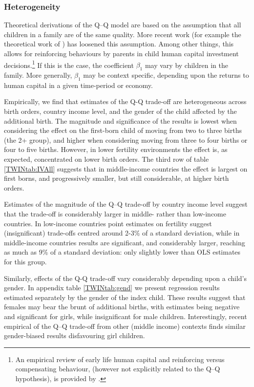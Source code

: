 \documentclass[subeqn]{article}
\begin{document}
\begin{spacing}{1.4}
\subsubsection{Heterogeneity}
Theoretical derivations of the Q--Q model are based on the assumption that all
children in a family are of the same quality. More recent work (for example the 
theoretical work of \citet{AizerCunha2012}) has loosened this assumption. Among 
other things, this allows for reinforcing behaviours by parents in child human 
capital investment decisions.\footnote{An empirical review of early life human 
capital and reinforcing versus compensating behaviour, (however not explicitly 
related to the Q--Q hypothesis), is provided by \citet{AlmondMazumder2013}.} If 
this is the case, the coefficient $\beta_1$ may vary by children in the family. 
More generally, $\beta_1$ may be context specific, depending upon the returns to 
human capital in a given time-period or economy.

Empirically, we find that estimates of the Q-Q trade-off are heterogeneous 
across birth orders, country income level, and the gender of the child affected 
by the additional birth. The magnitude and significance of the results is lowest 
when considering the effect on the first-born child of moving from two to three 
births (the 2+ group), and higher when considering moving from three to four 
births or four to five births. However, in lower fertility environments the 
effect is, as expected, concentrated on lower birth orders. The third row of 
table \ref{TWINtab:IVAll} suggests that in middle-income countries the effect is 
largest on first borns, and progressively smaller, but still considerable, at 
higher birth orders.

Estimates of the magnitude of the Q--Q trade-off by country income level suggest 
that the trade-off is considerably larger in middle- rather than low-income 
countries. In low-income countries point estimates on fertility suggest 
(insignificant) trade-offs centred around 2-3\% of a standard deviation, while 
in middle-income countries results are significant, and considerably larger,
reaching as much as 9\% of a standard deviation: only slightly lower than OLS 
estimates for this group.

Similarly, effects of the Q-Q trade-off vary considerably depending upon a 
child's gender. In appendix table \ref{TWINtab:gend} we present regression 
results estimated separately by the gender of the index child. These results 
suggest that females may bear the brunt of additional births, with estimates
being negative and significant for girls, while insignificant for male children. 
Interestingly, recent empirical of the Q--Q trade-off from other (middle income)
contexts finds similar gender-biased results \citep{SouzaPonczek2012} 
disfavouring girl children.


\end{spacing}
\end{document}
